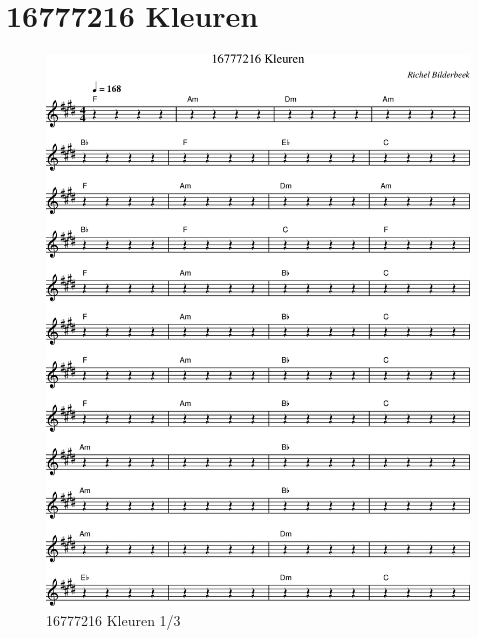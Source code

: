 \chapter{16777216 Kleuren}



\begin{figure}[!htbp]
  \includegraphics[width=\textwidth,height=\textheight,keepaspectratio]{../songs/64_16777216_kleuren-0.png}
  \caption{16777216 Kleuren 1/3}
  \label{fig:64_16777216_kleuren_1}
\end{figure}

